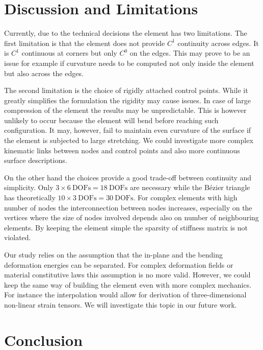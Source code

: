\documentclass{egpubl}
\begin{document}


\section{Discussion and Limitations} %

Currently, due to the technical decisions the element has two limitations.
The first limitation is that the element does not provide $C^1$ continuity
across edges. It is $C^1$ continuous at corners but only $C^0$ on the
edges. This may prove to be an issue for example if curvature needs to be
computed not only inside the element but also across the edges.

The second limitation is the choice of rigidly attached control points. 
While it greatly simplifies the formulation the rigidity may cause issues.
In case of large compression of the element the results may be
unpredictable. This is however unlikely to occur because the element will
bend before reaching such configuration. It may, however, fail to maintain
even curvature of the surface if the element is subjected to large
stretching.
We could investigate more complex kinematic links between nodes and control points 
and also more continuous surface descriptions.

On the other hand the choices provide a good trade-off between continuity
and simplicity. Only $ 3 \times 6~\mathrm{DOFs} = 18~\mathrm{DOFs}$ are
necessary while the B\'ezier triangle has theoretically $ 10 \times
3~\mathrm{DOFs} = 30~\mathrm{DOFs}$. For complex elements with high number
of nodes the interconnection between nodes increases, especially on the
vertices where the size of nodes involved depends also on number of
neighbouring elements. By keeping the element simple the sparsity of
stiffness matrix is not violated.

Our study relies on the assumption that the in-plane and the bending deformation energies can be separated.
For complex deformation fields or material constitutive laws  this assumption is no more valid.
However, we could keep the same way of building the element even with more complex mechanics. 
For instance the interpolation would allow for derivation of three-dimensional non-linear strain tensors.
We will investigate this topic in our future work.


\section{Conclusion} %
\end{document}
